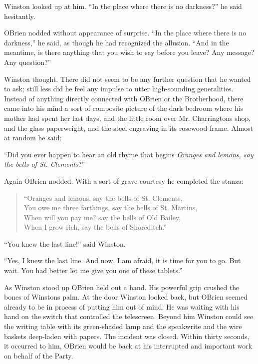 Winston looked up at him. ``In the place where there is no darkness?'' he
said hesitantly.

O\textquotesingle Brien nodded without appearance of surprise. ``In the
place where there is no darkness,'' he said, as though he had recognized
the allusion. ``And in the meantime, is there anything that you wish to
say before you leave? Any message? Any question?''

Winston thought. There did not seem to be any further question that he
wanted to ask; still less did he feel any impulse to utter high-sounding
generalities. Instead of anything directly connected with
O\textquotesingle Brien or the Brotherhood, there came into his mind a
sort of composite picture of the dark bedroom where his mother had spent
her last days, and the little room over Mr.
Charrington\textquotesingle s shop, and the glass paperweight, and the
steel engraving in its rosewood frame. Almost at random he said:

``Did you ever happen to hear an old rhyme that begins \emph{Oranges and
lemons, say the bells of St. Clement\textquotesingle s}?''

Again O\textquotesingle Brien nodded. With a sort of grave courtesy he
completed the stanza:

\begin{quotation}
  \noindent ``Oranges and lemons, say the bells of St. Clement\textquotesingle s,\\
  You owe me three farthings, say the bells of St. Martin\textquotesingle s,\\
  When will you pay me? say the bells of Old Bailey,\\
  When I grow rich, say the bells of Shoreditch.''
\end{quotation}

``You knew the last line!'' said Winston.

``Yes, I knew the last line. And now, I am afraid, it is time for you to
go. But wait. You had better let me give you one of these tablets.''

As Winston stood up O\textquotesingle Brien held out a hand. His
powerful grip crushed the bones of Winston\textquotesingle s palm. At
the door Winston looked back, but O\textquotesingle Brien seemed already
to be in process of putting him out of mind. He was waiting with his
hand on the switch that controlled the telescreen. Beyond him Winston
could see the writing table with its green-shaded lamp and the
speakwrite and the wire baskets deep-laden with papers. The incident was
closed. Within thirty seconds, it occurred to him,
O\textquotesingle Brien would be back at his interrupted and important
work on behalf of the Party.


